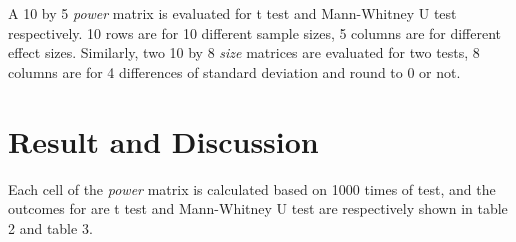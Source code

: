 \documentclass[]{article}
\begin{document}
A 10 by 5 \emph{power} matrix is evaluated for t test and Mann-Whitney U
test respectively. 10 rows are for 10 different sample sizes, 5 columns
are for different effect sizes. Similarly, two 10 by 8 \emph{size}
matrices are evaluated for two tests, 8 columns are for 4 differences of
standard deviation and round to 0 or not.

\hypertarget{result-and-discussion}{%
\section{Result and Discussion}\label{result-and-discussion}}

Each cell of the \emph{power} matrix is calculated based on 1000 times
of test, and the outcomes for are t test and Mann-Whitney U test are
respectively shown in table 2 and table 3.
\end{document}
